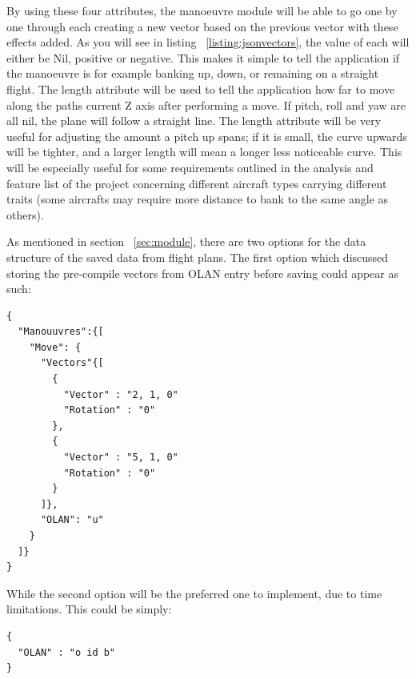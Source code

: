 By using these four attributes, the manoeuvre module will be able to go one by one through each creating a new vector based on the previous vector with these effects added. As you will see in listing ~\ref{listing:jsonvectors}, the value of each will either be Nil, positive or negative. This makes it simple to tell the application if the manoeuvre is for example banking up, down, or remaining on a straight flight. The length attribute will be used to tell the application how far to move along the paths current Z axis after performing a move. If pitch, roll and yaw are all nil, the plane will follow a straight line. The length attribute will be very useful for adjusting the amount a pitch up spans; if it is small, the curve upwards will be tighter, and a larger length will mean a longer less noticeable curve. This will be especially useful for some requirements outlined in the analysis and feature list of the project concerning different aircraft types carrying different traits (some aircrafts may require more distance to bank to the same angle as others).

As mentioned in section ~\ref{sec:module}, there are two options for the data structure of the saved data from flight plans. The first option which discussed storing the pre-compile vectors from OLAN entry before saving could appear as such:

\lstset{language=JavaScript}
\medskip
\begin{lstlisting}[caption=A JSON means of holding break downs of manoeuvres with each one holding information on different variants of the move such as inverse and reverse and description of the OLAN notation]
{
  "Manouuvres":{[
    "Move": {
      "Vectors"{[
        {
          "Vector" : "2, 1, 0"
          "Rotation" : "0"
        },
        {
          "Vector" : "5, 1, 0"
          "Rotation" : "0"
        }
      ]},
      "OLAN": "u"
    }
  ]}
}
\end{lstlisting}
\label{listing:jsonvectors}

While the second option will be the preferred one to implement, due to time limitations. This could be simply:

\lstset{language=JavaScript}
\medskip
\begin{lstlisting}[caption=A JSON means of holding break downs of manoeuvres with each one holding information on different variants of the move such as inverse and reverse and description of the OLAN notation]
{
  "OLAN" : "o id b"
}
\end{lstlisting}

